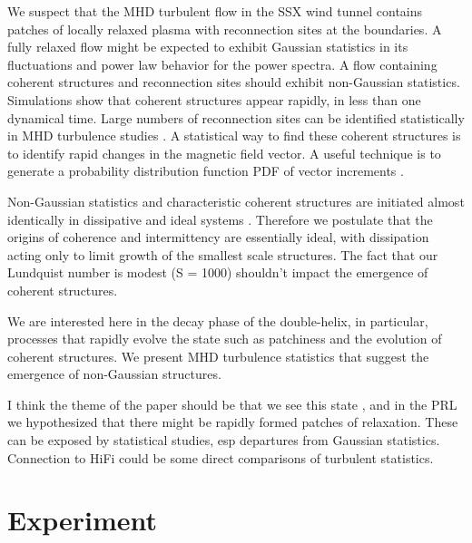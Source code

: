 \documentclass[12pt]{iopart}
\begin{document}
We suspect that the MHD turbulent flow in the SSX wind tunnel contains patches of locally relaxed plasma with reconnection sites at the boundaries.  A fully relaxed flow might be expected to exhibit Gaussian statistics in its fluctuations and power law behavior for the power spectra.  A flow containing coherent structures and reconnection sites should exhibit non-Gaussian statistics.  Simulations show that coherent structures appear rapidly, in less than one dynamical time.  Large numbers of reconnection sites can be identified statistically in MHD turbulence studies \cite{Servidio09,Servidio10a}.  A statistical way to find these coherent structures is to identify rapid changes in the magnetic field vector.  A useful technique is to generate a probability distribution function PDF of vector increments \cite{Greco08,Greco09}.

Non-Gaussian statistics and characteristic coherent structures are initiated almost identically in dissipative and ideal systems \cite{Wan09}. Therefore we postulate that the origins of coherence and intermittency are essentially ideal, with dissipation acting only to limit growth of the smallest scale structures.  The fact that our Lundquist number is modest (S = 1000) shouldn't impact the emergence of coherent structures.

We are interested here in the decay phase of the double-helix, in particular, processes that rapidly evolve the state such as patchiness and the evolution of coherent structures.  We present MHD turbulence statistics that suggest the emergence of non-Gaussian structures.

I think the theme of the paper should be that we see this state \cite{Gray13}, and in the PRL we hypothesized that there might be rapidly formed patches of relaxation.  These can be exposed by statistical studies, esp departures from Gaussian statistics.   Connection to HiFi could be some direct comparisons of turbulent statistics.

\section{Experiment}
\end{document}
